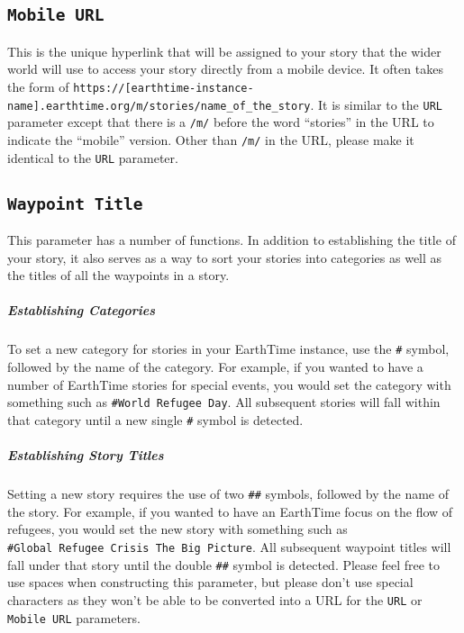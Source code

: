 \documentclass[
]{book}
\begin{document}
\hypertarget{mobile-url}{%
\subsection*{\texorpdfstring{\texttt{Mobile\ URL}}{Mobile URL}}\label{mobile-url}}


This is the unique hyperlink that will be assigned to your story that the wider world will use to access your story directly from a mobile device. It often takes the form of \texttt{https://{[}earthtime-instance-name{]}.earthtime.org/m/stories/name\_of\_the\_story}. It is similar to the \texttt{URL} parameter except that there is a \texttt{/m/} before the word ``stories'' in the URL to indicate the ``mobile'' version. Other than \texttt{/m/} in the URL, please make it identical to the \texttt{URL} parameter.

\hypertarget{waypoint-title}{%
\subsection*{\texorpdfstring{\texttt{Waypoint\ Title}}{Waypoint Title}}\label{waypoint-title}}


This parameter has a number of functions. In addition to establishing the title of your story, it also serves as a way to sort your stories into categories as well as the titles of all the waypoints in a story.

\hypertarget{establishing-categories}{%
\subparagraph*{Establishing Categories}\label{establishing-categories}}

To set a new category for stories in your EarthTime instance, use the \texttt{\#} symbol, followed by the name of the category. For example, if you wanted to have a number of EarthTime stories for special events, you would set the category with something such as \texttt{\#World\ Refugee\ Day}. All subsequent stories will fall within that category until a new single \texttt{\#} symbol is detected.

\hypertarget{establishing-story-titles}{%
\subparagraph*{Establishing Story Titles}\label{establishing-story-titles}}

Setting a new story requires the use of two \texttt{\#\#} symbols, followed by the name of the story. For example, if you wanted to have an EarthTime focus on the flow of refugees, you would set the new story with something such as \texttt{\#Global\ Refugee\ Crisis\ The\ Big\ Picture}. All subsequent waypoint titles will fall under that story until the double \texttt{\#\#} symbol is detected. Please feel free to use spaces when constructing this parameter, but please don't use special characters as they won't be able to be converted into a URL for the \texttt{URL} or \texttt{Mobile\ URL} parameters.
\end{document}
